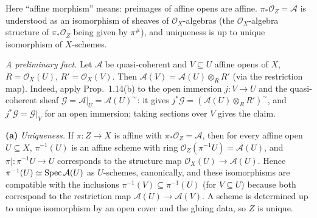 \documentclass[11pt]{article}
\begin{document}
\pf
Here ``affine morphism'' means: preimages of affine opens are affine. $\pi_*\mathcal O_Z=\mathcal A$ is understood as an isomorphism of sheaves of $\mathcal O_X$-algebras (the $\mathcal O_X$-algebra structure of $\pi_*\mathcal O_Z$ being given by $\pi^\#$), and uniqueness is up to unique isomorphism of $X$-schemes.

\emph{A preliminary fact.} Let $\mathcal A$ be quasi-coherent and $V\subseteq U$ affine opens of $X$, $R=\mathcal O_X(U)$, $R'=\mathcal O_X(V)$. Then $\mathcal A(V)=\mathcal A(U)\otimes_RR'$ (via the restriction map). Indeed, apply Prop.~1.14(b) to the open immersion $j:V\to U$ and the quasi-coherent sheaf $\mathcal G=\mathcal A|_U=\mathcal A(U)^\sim$: it gives $j^*\mathcal G=(\mathcal A(U)\otimes_RR')^\sim$, and $j^*\mathcal G=\mathcal G|_V$ for an open immersion; taking sections over $V$ gives the claim.

\textbf{(a)} \emph{Uniqueness.} If $\pi:Z\to X$ is affine with $\pi_*\mathcal O_Z=\mathcal A$, then for every affine open $U\subseteq X$, $\pi^{-1}(U)$ is an affine scheme with ring $\mathcal O_Z(\pi^{-1}U)=\mathcal A(U)$, and $\pi|:\pi^{-1}U\to U$ corresponds to the structure map $\mathcal O_X(U)\to\mathcal A(U)$. Hence $\pi^{-1}(U)\simeq\operatorname{Spec}\mathcal A(U)$ as $U$-schemes, canonically, and these isomorphisms are compatible with the inclusions $\pi^{-1}(V)\subseteq\pi^{-1}(U)$ (for $V\subseteq U$) because both correspond to the restriction map $\mathcal A(U)\to\mathcal A(V)$. A scheme is determined up to unique isomorphism by an open cover and the gluing data, so $Z$ is unique.
\end{document}
